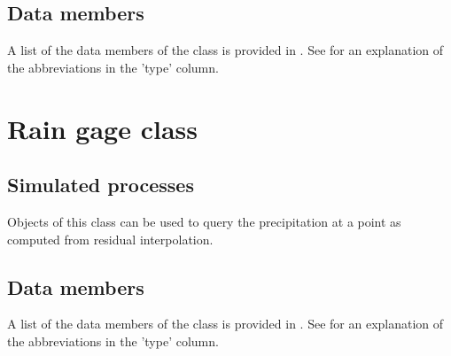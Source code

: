 \subsection{Data members} \label{sec:classes:catchmod:gage:members}
A list of the data members of the class is provided in . See \citet{Echse-Main-Doc} for an explanation of the abbreviations in the 'type' column.



\section{Rain gage class} \label{sec:classes:catchmod:raingage}

\subsection{Simulated processes} \label{sec:classes:catchmod:raingage:processes}
Objects of this class can be used to query the precipitation at a point as computed from residual interpolation.

\subsection{Data members} \label{sec:classes:catchmod:raingage:members}
A list of the data members of the class is provided in . See \citet{Echse-Main-Doc} for an explanation of the abbreviations in the 'type' column.



